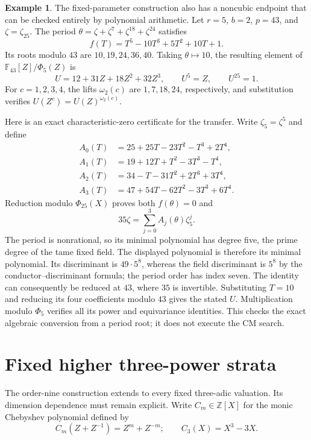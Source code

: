 \documentclass[11pt]{article}
\theoremstyle{definition}
\newtheorem{example}[theorem]{Example}
\theoremstyle{remark}
\begin{document}
\begin{example}\label{ex:fixed-wild-r5-f43}
The fixed-parameter construction also has a noncubic endpoint that
can be checked entirely by polynomial arithmetic. Let \(r=5\),
\(b=2\), \(p=43\), and \(\zeta=\zeta_{25}\). The period
\(\theta=\zeta+\zeta^7+\zeta^{18}+\zeta^{24}\) satisfies
\[
 f(T)=T^5-10T^3+5T^2+10T+1.
\]
Its roots modulo \(43\) are \(10,19,24,36,40\). Taking
\(\theta\mapsto10\), the resulting element of
\(\mathbb F_{43}[Z]/\Phi_5(Z)\) is
\[
 U=12+31Z+18Z^2+32Z^3,
 \qquad U^5=Z,\qquad U^{25}=1.
\]
For \(c=1,2,3,4\), the lifts \(\omega_2(c)\) are
\(1,7,18,24\), respectively, and substitution verifies
\(U(Z^c)=U(Z)^{\omega_2(c)}\).

Here is an exact characteristic-zero certificate for the transfer.
Write \(\zeta_5=\zeta^5\) and define
\[
\begin{aligned}
A_0(T)&=25+25T-23T^2-T^3+2T^4,\\
A_1(T)&=19+12T+T^2-3T^3-T^4,\\
A_2(T)&=34-T-31T^2+2T^3+3T^4,\\
A_3(T)&=47+54T-62T^2-3T^3+6T^4.
\end{aligned}
\]
Reduction modulo \(\Phi_{25}(X)\) proves both
\(f(\theta)=0\) and
\[
 35\zeta=\sum_{j=0}^3 A_j(\theta)\zeta_5^j.
\]
The period is nonrational, so its minimal polynomial has degree
five, the prime degree of the tame fixed field. The displayed
polynomial is therefore its minimal polynomial. Its discriminant
is \(49\cdot5^8\), whereas the field discriminant is
\(5^8\) by the conductor--discriminant formula; the period order
has index seven. The identity can consequently be reduced at
\(43\), where \(35\) is invertible. Substituting \(T=10\)
and reducing its four coefficients modulo \(43\) gives the stated
\(U\). Multiplication modulo \(\Phi_5\) verifies all its power
and equivariance identities. This checks the exact algebraic
conversion from a period root; it does not execute the CM search.
\end{example}

\section{Fixed higher three-power strata}
\label{sec:kummer-higher-three-powers}

The order-nine construction extends to every fixed three-adic
valuation. Its dimension dependence must remain explicit. Write
\(C_m\in\mathbb Z[X]\) for the monic Chebyshev polynomial
defined by
\[
 C_m(Z+Z^{-1})=Z^m+Z^{-m};\qquad C_3(X)=X^3-3X.
\]
\end{document}
